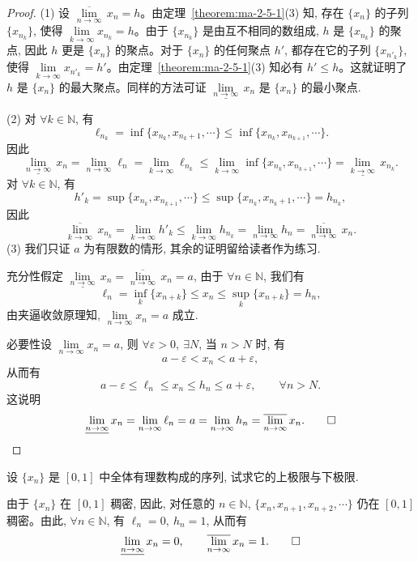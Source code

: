 \begin{proof}
(1) 设 $\overline{\lim\limits_{n\to\infty}}\,x_n=h$。由定理~\ref{theorem:ma-2-5-1}(3) 知, 存在 $\{x_n\}$ 的子列 $\{x_{n_k}\}$, 使得 $\lim\limits_{k\to\infty}x_{n_k}=h$。由于 $\{x_{n_k}\}$ 是由互不相同的数组成, $h$ 是 $\{x_{n_k}\}$ 的聚点, 因此 $h$ 更是 $\{x_n\}$ 的聚点。对于 $\{x_n\}$ 的任何聚点 $h'$, 都存在它的子列 $\{x_{n'_k}\}$, 使得 $\lim\limits_{k\to\infty}x_{n'_k}=h'$。由定理~\ref{theorem:ma-2-5-1}(3) 知必有 $h'\leqslant h$。这就证明了 $h$ 是 $\{x_n\}$ 的最大聚点。同样的方法可证 $\underline{\lim\limits_{n\to\infty}}\,x_n$ 是 $\{x_n\}$ 的最小聚点.

(2) 对 $\forall k\in\mathbb{N}$, 有
\[
  \ell_{n_k}=\inf\{x_{n_k},x_{n_k+1},\cdots\}
  \leqslant
  \inf\{x_{n_k},x_{n_{k+1}},\cdots\}.
\]
因此
\[
  \underline{\lim_{n\to\infty}}\,x_n
  =
  \lim_{n\to\infty}\ell_n
  =
  \lim_{k\to\infty}\ell_{n_k}
  \leqslant
  \lim_{k\to\infty}\inf\{x_{n_k},x_{n_{k+1}},\cdots\}
  =
  \underline{\lim_{k\to\infty}}\,x_{n_k}.
\]
对 $\forall k\in\mathbb{N}$, 有
\[
  h'_k=\sup\{x_{n_k},x_{n_{k+1}},\cdots\}
  \leqslant
  \sup\{x_{n_k},x_{n_k+1},\cdots\}=h_{n_k},
\]
因此
\[
  \overline{\lim_{k\to\infty}}\,x_{n_k}
  =
  \lim_{k\to\infty}h'_k
  \leqslant
  \lim_{k\to\infty}h_{n_k}
  =
  \lim_{n\to\infty}h_n
  =
  \overline{\lim_{n\to\infty}}\,x_n.
\]
(3) 我们只证 $a$ 为有限数的情形, 其余的证明留给读者作为练习.

充分性\quad 假定 $\underline{\lim\limits_{n\to\infty}}\,x_n=\overline{\lim\limits_{n\to\infty}}\,x_n=a$, 由于 $\forall n\in\mathbb{N}$, 我们有
\[
  \ell_n=\inf_k\{x_{n+k}\}\leqslant x_n\leqslant\sup_k\{x_{n+k}\}=h_n,
\]
由夹逼收敛原理知, $\lim\limits_{n\to\infty}x_n=a$ 成立.

必要性\quad 设 $\lim\limits_{n\to\infty}x_n=a$, 则 $\forall\varepsilon>0,\ \exists N$, 当 $n>N$ 时, 有
\[
  a-\varepsilon<x_n<a+\varepsilon,
\]
从而有
\[
  a-\varepsilon\leqslant\ell_n\leqslant x_n\leqslant h_n\leqslant a+\varepsilon,\qquad \forall n>N.
\]
这说明
\[
  \underline{\lim_{n\to\infty}}\,x_n
  =
  \lim_{n\to\infty}\ell_n
  =
  a
  =
  \lim_{n\to\infty}h_n
  =
  \overline{\lim_{n\to\infty}}\,x_n.
\qedhere
\]
\end{proof}


\begin{example}\label{example:ma-2-5-2}
设 $\{x_n\}$ 是 $[0,1]$ 中全体有理数构成的序列, 试求它的上极限与下极限.
\end{example}


\begin{solve}[{解法 1}]
由于 $\{x_n\}$ 在 $[0,1]$ 稠密, 因此, 对任意的 $n\in\mathbb{N}$, $\{x_n,x_{n+1},x_{n+2},\cdots\}$ 仍在 $[0,1]$ 稠密。由此, $\forall n\in\mathbb{N}$, 有 $\ell_n=0,\ h_n=1$, 从而有
\[
  \underline{\lim_{n\to\infty}}\,x_n=0,
  \qquad
  \overline{\lim_{n\to\infty}}\,x_n=1.
\qedhere
\]
\end{solve}


